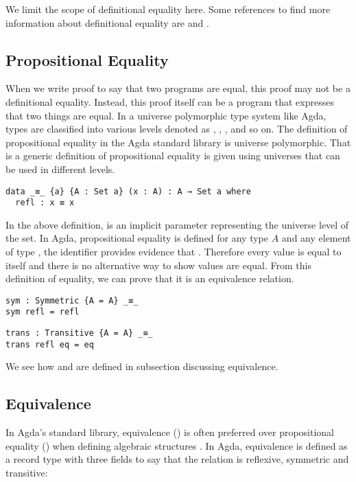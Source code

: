 We limit the scope of definitional equality here. Some references to find more
information about definitional equality are \cite{norell2007towards} and
\cite{martin1984intuitionistic}. 

\subsection{Propositional Equality}
When we write proof to say that two programs are equal, this proof may not be
a definitional equality. Instead, this proof itself can be a program that
expresses that two things are equal. In a universe polymorphic type system like
Agda, types are classified into various levels denoted as , ,
, and so on. The definition of propositional equality in the Agda standard
library is universe polymorphic. That is a generic definition of propositional
equality is given using universes that can be used in different levels.

\begin{verbatim}
data _≡_ {a} {A : Set a} (x : A) : A → Set a where
  refl : x ≡ x
\end{verbatim}

In the above definition,  is an implicit parameter representing the
universe level of the set. In Agda, propositional equality  is
defined for any type $A$ and any element  of type , the
identifier  provides evidence that . Therefore every
value is equal to itself and there is no alternative way to show values are
equal. From this definition of equality, we can prove that it is an equivalence
relation.

\begin{verbatim}
sym : Symmetric {A = A} _≡_
sym refl = refl
\end{verbatim}

\begin{verbatim}
trans : Transitive {A = A} _≡_
trans refl eq = eq
\end{verbatim}

We see how  and  are defined in subsection
discussing equivalence.

\subsection{Equivalence}
In Agda's standard library, equivalence () is often preferred over
propositional equality () when defining algebraic structures
\cite{musa}. In Agda, equivalence is defined as a record type with three fields
to say that the relation is reflexive, symmetric and transitive:

